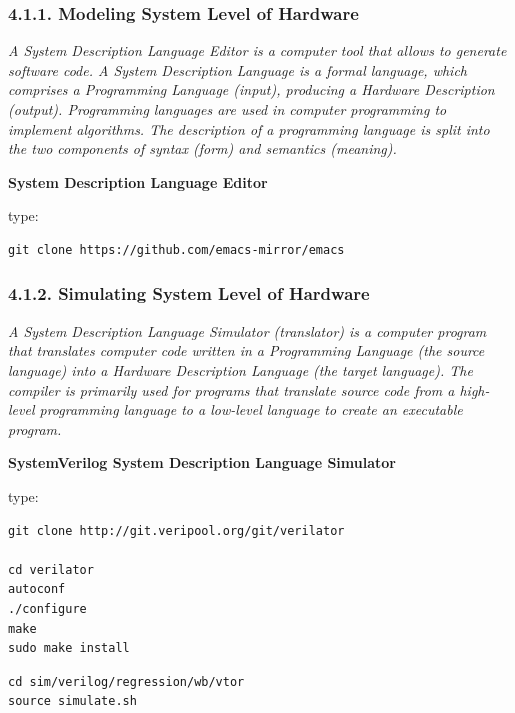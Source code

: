 \documentclass[
]{article}
\begin{document}
\hypertarget{modeling-system-level-of-hardware-1}{%
\subsubsection{4.1.1. Modeling System Level of
Hardware}\label{modeling-system-level-of-hardware-1}}

\emph{A System Description Language Editor is a computer tool that
allows to generate software code. A System Description Language is a
formal language, which comprises a Programming Language (input),
producing a Hardware Description (output). Programming languages are
used in computer programming to implement algorithms. The description of
a programming language is split into the two components of syntax (form)
and semantics (meaning).}

\textbf{System Description Language Editor}

type:

\begin{verbatim}
git clone https://github.com/emacs-mirror/emacs
\end{verbatim}

\hypertarget{simulating-system-level-of-hardware-1}{%
\subsubsection{4.1.2. Simulating System Level of
Hardware}\label{simulating-system-level-of-hardware-1}}

\emph{A System Description Language Simulator (translator) is a computer
program that translates computer code written in a Programming Language
(the source language) into a Hardware Description Language (the target
language). The compiler is primarily used for programs that translate
source code from a high-level programming language to a low-level
language to create an executable program.}

\textbf{SystemVerilog System Description Language Simulator}

type:

\begin{verbatim}
git clone http://git.veripool.org/git/verilator

cd verilator
autoconf
./configure
make
sudo make install
\end{verbatim}

\begin{verbatim}
cd sim/verilog/regression/wb/vtor
source simulate.sh
\end{verbatim}
\end{document}
